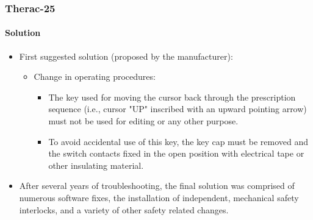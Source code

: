 \begin{frame}[hasprev=true, hasnext=false]
\frametitle{Therac-25}
\framesubtitle{Solution}

\begin{itemize}
	\item First suggested solution (proposed by the manufacturer):
	\begin{itemize}
		\item Change in operating procedures:
		\begin{itemize}
			\item The key used for moving the cursor back through the
			prescription sequence (i.e., cursor "UP" inscribed with an upward
			pointing arrow) must not be used for editing or any other purpose.

			\item To avoid accidental use of this key, the key cap must be
			removed and the switch contacts fixed in the open position with
			electrical tape or other insulating material.
		\end{itemize}
	\end{itemize}

	\item After several years of troubleshooting, the final solution was
	comprised of numerous software fixes, the installation of independent,
	mechanical safety interlocks, and a variety of other safety related
	changes.
\end{itemize}

\end{frame}